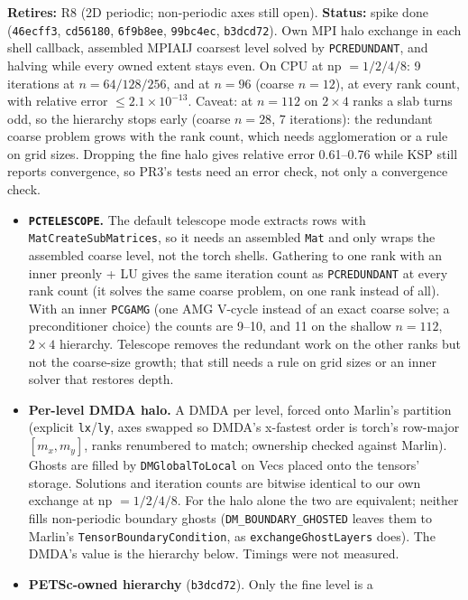 \documentclass[11pt]{article}
\newcommand{\status}[1]{\textcolor{marlinteal}{\textbf{Status:}} #1}
\begin{document}
\textbf{Retires:} R8 (2D periodic; non-periodic axes still open). \status{spike done
(\texttt{46ecff3}, \texttt{cd56180}, \texttt{6f9b8ee}, \texttt{99bc4ec}, \texttt{b3dcd72}). Own MPI halo
exchange in each shell callback, assembled MPIAIJ coarsest level solved by
\texttt{PCREDUNDANT}, and halving while every owned extent stays even.
On CPU at np $=1/2/4/8$: 9 iterations at $n=64/128/256$, and at $n=96$
(coarse $n=12$), at every rank count, with relative error $\le 2.1\times10^{-13}$.
Caveat: at $n=112$ on $2\times4$ ranks a slab turns odd, so the hierarchy
stops early (coarse $n=28$, 7 iterations): the redundant coarse problem
grows with the rank count, which needs agglomeration or a rule on grid sizes.
Dropping the fine halo gives relative error 0.61--0.76 while KSP still reports
convergence, so PR3's tests need an error check, not only a convergence check.
\begin{itemize}[leftmargin=*]
\item \textbf{\texttt{PCTELESCOPE}.} The default telescope mode extracts rows
with \texttt{MatCreateSubMatrices}, so it needs an assembled \texttt{Mat} and
only wraps the assembled coarse level, not the torch shells. Gathering to one
rank with an inner preonly + LU gives the same iteration count as
\texttt{PCREDUNDANT} at every rank count (it solves the same coarse problem,
on one rank instead of all). With an inner \texttt{PCGAMG} (one AMG V-cycle
instead of an exact coarse solve; a preconditioner choice) the counts are
9--10, and 11 on the shallow $n=112$, $2\times4$ hierarchy. Telescope removes
the redundant work on the other ranks but not the coarse-size growth; that
still needs a rule on grid sizes or an inner solver that restores depth.
\item \textbf{Per-level DMDA halo.} A DMDA per level, forced onto Marlin's
partition (explicit \texttt{lx}/\texttt{ly}, axes swapped so DMDA's x-fastest
order is torch's row-major $[m_x, m_y]$, ranks renumbered to match; ownership
checked against Marlin). Ghosts are filled by \texttt{DMGlobalToLocal} on Vecs
placed onto the tensors' storage. Solutions and iteration counts are
bitwise identical to our own exchange at np $=1/2/4/8$. For the halo alone the
two are equivalent; neither fills non-periodic boundary ghosts
(\texttt{DM\_BOUNDARY\_GHOSTED} leaves them to Marlin's
\texttt{TensorBoundaryCondition}, as \texttt{exchangeGhostLayers} does). The DMDA's
value is the hierarchy below. Timings were not measured.
\item \textbf{PETSc-owned hierarchy} (\texttt{b3dcd72}). Only the fine level is a

\end{itemize}}
\end{document}
